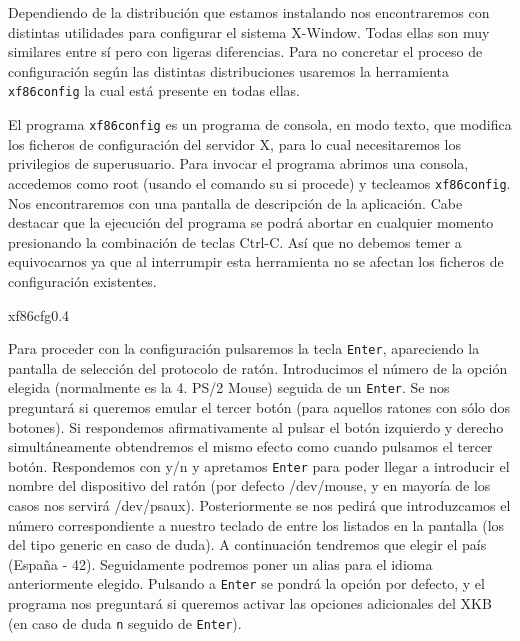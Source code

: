 Dependiendo   de   la   distribución  que   estamos   instalando   nos
encontraremos  con distintas  utilidades  para  configurar el  sistema
X-Window.  Todas ellas  son muy  similares entre  sí pero  con ligeras
diferencias. Para no  concretar el proceso de  configuración según las
distintas distribuciones  usaremos la herramienta {\tt  xf86config} la
cual está presente en todas ellas.

El programa {\tt xf86config} es un programa de consola, en modo texto,
que modifica  los ficheros  de configuración del  servidor X,  para lo
cual necesitaremos  los privilegios  de superusuario. Para  invocar el
programa abrimos una  consola, accedemos como root  (usando el comando
su si procede) y  tecleamos {\tt xf86config}. Nos encontraremos con
una  pantalla  de descripción  de  la  aplicación. Cabe  destacar  que
la  ejecución  del programa  se  podrá  abortar en  cualquier  momento
presionando la combinación  de teclas Ctrl-C. Así que no  debemos temer a
equivocarnos ya que al interrumpir  esta herramienta no se afectan los
ficheros de configuración existentes.

\begin{figura}{xf86cfg}{0.4}
\caption{xf86cfg. Utilidad para configurar el servidor X}
\end{figura}

Para proceder  con la configuración  pulsaremos la tecla  {\tt Enter},
apareciendo  la   pantalla  de  selección  del   protocolo  de  ratón.
Introducimos el número de la opción elegida (normalmente es la 4. PS/2
Mouse) seguida de un {\tt Enter}. Se nos preguntará si queremos emular
el  tercer botón  (para aquellos  ratones  con sólo  dos botones).  Si
respondemos  afirmativamente al  pulsar el  botón izquierdo  y derecho
simultáneamente obtendremos  el mismo  efecto como cuando  pulsamos el
tercer  botón.  Respondemos  con  y/n y  apretamos  {\tt  Enter}  para
poder  llegar  a  introducir  el  nombre  del  dispositivo  del  ratón
(por  defecto  /dev/mouse, y  en  mayoría  de  los casos  nos  servirá
/dev/psaux). Posteriormente se nos  pedirá que introduzcamos el número
correspondiente a nuestro teclado de entre los listados en la pantalla
(los del tipo  generic en caso de duda). A  continuación tendremos que
elegir el  país (España  - 42). Seguidamente  podremos poner  un alias
para el idioma anteriormente elegido. Pulsando a {\tt Enter} se pondrá
la  opción por  defecto,  y  el programa  nos  preguntará si  queremos
activar las  opciones adicionales  del XKB  (en caso  de duda  {\tt n}
seguido de {\tt Enter}).

